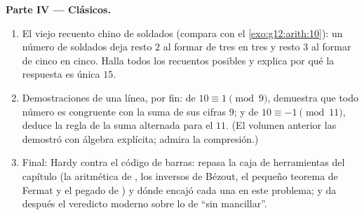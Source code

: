 \begin{problem}
\medskip
\noindent\textbf{Parte IV --- Clásicos.}
\begin{enumerate}[resume]
  \item El viejo recuento chino de soldados (compara con el
        \cref{exo:g12:arith:10}): un número de soldados deja resto $2$ al
        formar de tres en tres y resto $3$ al formar de cinco en cinco.
        Halla todos los recuentos posibles y explica por qué la respuesta
        es única  $15$.
  \item Demostraciones de una línea, por fin: de $10 \equiv 1 \pmod 9$,
        demuestra que todo número es congruente con la suma de sus cifras
         $9$; y de $10 \equiv -1 \pmod{11}$, deduce la regla de la
        suma alternada para el $11$. (El volumen anterior las demostró con
        álgebra explícita; admira la compresión.)
  \item Final: Hardy contra el código de barras: repasa la caja de
        herramientas del capítulo (la aritmética de , los
        inversos de Bézout, el pequeño teorema de Fermat y el pegado de
         ) y dónde encajó cada una en este problema;
        y da después el veredicto moderno sobre lo de ``sin mancillar''.
\end{enumerate}
\end{problem}
